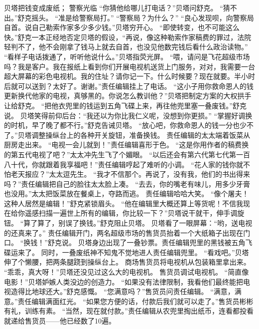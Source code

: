 \documentclass[a4paper,12pt,UTF8,twoside]{ctexbook}
\begin{document}
        贝塔把钱变成废纸； 
        警察光临   
        “你猜他给哪儿打电话？”贝塔问舒克。 
        “猜不出。”舒克摇头。 
        “准是给警察局打。” 
        “警察局？为什么？” 
        “良心发现呗，向警察局自首。说自己勒索作家多少多少钱。”贝塔穷开心。 
        “即使转变，也不可能这么快。”舒克一本正经地否定贝塔的假设，“再说，像这种勒索作家稿费的罪过，法院轻判不了，他不会刚拿了钱马上就去自首，也没见他数完钱后看什么政治读物。” 
        “看样子电话拨通了，听听他说什么。”贝塔指荧光屏。 
        “喂，请问是飞花超级市场吗？我是客户。我在报纸上看到你们开展电视机送货上门服务，对对，我需要一台超大屏幕的彩色电视机。我的住址？请你记一下。什么时候要？现在就要。半小时后就可以送到？太好了。谢谢。”责任编辑挂上了电话。 
        “这小子用你救命恩人的钱更新换代他家的电视，真够黑的。你说怎么教训他？”贝塔把制定方案的大权拱手让给舒克。 
        “把他衣兜里的钱运到五角飞碟上来，再往他兜里塞一叠废钱。”舒克说。 
        贝塔笑得前仰后台：“我还以为你比我仁义呢，没想到你更损。” 
        “掌握好调换的时机，早了晚了都不行。”舒克告诫贝塔。 
        “放心吧，你救命恩人的钱一分也少不了。”贝塔调整操纵台上的各种开关旋钮，准备换钱。 
        责任编辑的太太端着饭菜从厨房走出来。 
        “电视一会儿就到！”责任编辑喜形于色。 
        “这是你用作者的稿费换的第五代电视了吧？”太太冲先生飞了个媚眼。 
        “以后还会有第六代第七代第一百八十代，你就跟着我享福吧！”责任编辑哼起了难听的小调。 
        “花人家的钱你就不怕老天报应？”太太逗先生。 
        “我才不信那个。再说了，没有我，他们的书出得来吗？”责任编辑把自己的脸往太太脸上凑。 
        “去去，你的嘴老有味儿，用多少牙膏也没用。”太太把饭菜放在餐桌上，夺路而逃。 
        责任编辑哈哈大笑。 
        “像个屠夫！这种人居然是编辑！”舒克紧锁眉头。 
        “他在编辑里大概还算上等货呢！不信我现在给你遥感扫描一遍世上所有的编辑，你比较一下？”贝塔说干就干，伸手调旋钮。 
        “算了算了，别误了换钱。”舒克阻止贝塔。 
        贝塔看了一眼屏幕：“哟，送电视的还真来了。” 
        责任编辑开门，两名超级市场的售货员抬着一个大纸箱子出现在门口。 
        “换钱！”舒克说。 
        贝塔身边出现了一叠钞票。责任编辑兜里的黑钱被五角飞碟运来了。 
        同时，一叠废纸神不知鬼不觉地进人责任编辑兜里。 
        “看戏吧。”贝塔伸了个懒腰，把两条腿跷到操纵台上。 
        商场售货员将电视机从包装箱里拿出来。 
        “乖乖，真大呀！”贝塔还没见过这么大的电视机。 
        售货员调试电视机。 
        “简直像电影！”贝塔妒嫉人类没边的创造力。 
        “如果没有法律限制，我看他们最终能把电视造得比地球还大。”舒克感慨。 
        “您满意吗？”售货员问责任编辑。 
        “满意，满意。”责任编辑满面红光。 
        “如果您方便的话，付款后我们就可以走了。”售货员彬彬有礼，训练有素。 
        “当然，现在就付款。”责任编辑从农兜里掏出纸币，连看都投看就递给售货员——他已经数了10遍。 
\end{document}
